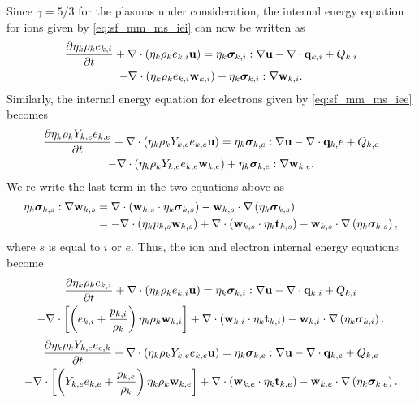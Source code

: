 \documentclass[a4paper,11pt]{report}
\begin{document}
Since $\gamma = 5/3$ for the plasmas under consideration, the internal energy equation for ions given by \cref{eq:sf_mm_ms_iei} can now be written as
\begin{multline*}
    \frac{\partial \eta_k \rho_k e_{k,i}}{\partial t} + \nabla \cdot \left( \eta_k \rho_k e_{k,i} \mathbf{u} \right) = \eta_k \bm \sigma_{k,i} : \nabla \mathbf{u} - \nabla \cdot \mathbf{q}_{k,i} + Q_{k,i} \\
    - \nabla \cdot \left( \eta_k \rho_k e_{k,i} \mathbf{w}_{k,i} \right) + \eta_k \bm \sigma_{k,i} : \nabla \mathbf{w}_{k,i}.
\end{multline*}
Similarly, the internal energy equation for electrons given by \cref{eq:sf_mm_ms_iee} becomes
\begin{multline*}
    \frac{\partial \eta_k \rho_k Y_{k,e} e_{k,e}}{\partial t} + \nabla \cdot \left( \eta_k \rho_k Y_{k,e} e_{k,e} \mathbf{u} \right) = \eta_k \bm \sigma_{k,e} : \nabla \mathbf{u} - \nabla \cdot \mathbf{q}_{k,}e + Q_{k,e} \\
    - \nabla \cdot \left( \eta_k \rho_k Y_{k,e} e_{k,e} \mathbf{w}_{k,e} \right) + \eta_k \bm \sigma_{k,e} : \nabla \mathbf{w}_{k,e}.
\end{multline*}
We re-write the last term in the two equations above as
\begin{align*}
    \eta_k \bm \sigma_{k,s} : \nabla \mathbf{w}_{k,s} &= \nabla \cdot \left( \mathbf{w}_{k,s} \cdot \eta_k \bm \sigma_{k,s} \right) - \mathbf{w}_{k,s} \cdot \nabla \left( \eta_k \bm \sigma_{k,s} \right) \\
    &= -\nabla \cdot (\eta_k p_{k,s} \mathbf{w}_{k,s} ) + \nabla \cdot \left( \mathbf{w}_{k,s} \cdot \eta_k \mathbf{t}_{k,s} \right) - \mathbf{w}_{k,s} \cdot \nabla \left( \eta_k \bm \sigma_{k,s} \right),
\end{align*}
where $s$ is equal to $i$ or $e$. Thus, the ion and electron internal energy equations become
\begin{multline*}
    \frac{\partial \eta_k \rho_k e_{k,i}}{\partial t} + \nabla \cdot \left( \eta_k \rho_k e_{k,i} \mathbf{u} \right) = \eta_k \bm \sigma_{k,i} : \nabla \mathbf{u} - \nabla \cdot \mathbf{q}_{k,i} + Q_{k,i} \\
    - \nabla \cdot \left[ \left( e_{k,i} + \frac{p_{k,i}}{\rho_k} \right) \eta_k \rho_k \mathbf{w}_{k,i} \right] + \nabla \cdot \left( \mathbf{w}_{k,i} \cdot \eta_k \mathbf{t}_{k,i} \right) - \mathbf{w}_{k,i} \cdot \nabla \left( \eta_k \bm \sigma_{k,i} \right).
\end{multline*}
\begin{multline*}
    \frac{\partial \eta_k \rho_k Y_{k,e} e_{e,k}}{\partial t} + \nabla \cdot \left( \eta_k \rho_k Y_{k,e} e_{k,e} \mathbf{u} \right) = \eta_k \bm \sigma_{k,e} : \nabla \mathbf{u} - \nabla \cdot \mathbf{q}_{k,e} + Q_{k,e} \\
    - \nabla \cdot \left[ \left( Y_{k,e} e_{k,e} + \frac{p_{k,e}}{\rho_k} \right) \eta_k \rho_k \mathbf{w}_{k,e} \right] + \nabla \cdot \left( \mathbf{w}_{k,e} \cdot \eta_k \mathbf{t}_{k,e} \right) - \mathbf{w}_{k,e} \cdot \nabla \left( \eta_k \bm \sigma_{k,e} \right).
\end{multline*}
\end{document}
